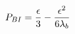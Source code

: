 \begin{equation}
P_{BI}={\epsilon \over 3}-{\epsilon^2 \over {6\lambda_b}}
\label{pressureeq}
\end{equation}

